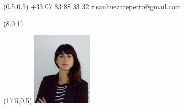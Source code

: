 \documentclass[french]{tccv}
\begin{document}


\begin{textblock}{6.5}(0.5,0.5)
    {+33 07 83 88 33 32}
    {r.sanhuezarepetto@gmail.com}
\end{textblock}

\begin{textblock}{10}(8.0,1)
         
\end{textblock}

\begin{textblock}{21}(17.5,0.5)
		\includegraphics[width=3cm]{../Figure/Rocio3.png}
\end{textblock}  
\end{document}

